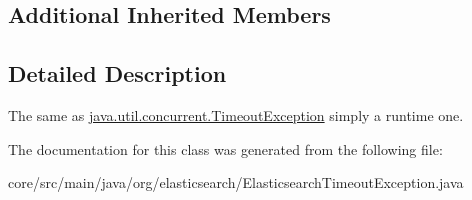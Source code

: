 \subsection*{Additional Inherited Members}


\subsection{Detailed Description}
The same as \hyperlink{}{java.\+util.\+concurrent.\+Timeout\+Exception} simply a runtime one. 

The documentation for this class was generated from the following file\+:\begin{DoxyCompactItemize}
\item 
core/src/main/java/org/elasticsearch/Elasticsearch\+Timeout\+Exception.\+java\end{DoxyCompactItemize}
